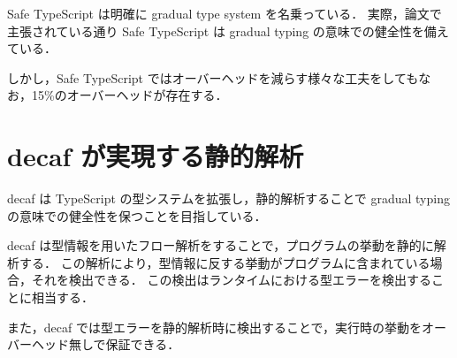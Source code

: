 Safe TypeScript は明確に gradual type system を名乗っている．
実際，論文で主張されている通り Safe TypeScript は gradual typing の意味での健全性を備えている．

しかし，Safe TypeScript ではオーバーヘッドを減らす様々な工夫をしてもなお，15\%のオーバーヘッドが存在する．

\section{decaf が実現する静的解析}

decaf は TypeScript の型システムを拡張し，静的解析することで gradual typing の意味での健全性を保つことを目指している．

decaf は型情報を用いたフロー解析をすることで，プログラムの挙動を静的に解析する．
この解析により，型情報に反する挙動がプログラムに含まれている場合，それを検出できる．
この検出はランタイムにおける型エラーを検出することに相当する．

また，decaf では型エラーを静的解析時に検出することで，実行時の挙動をオーバーヘッド無しで保証できる．
